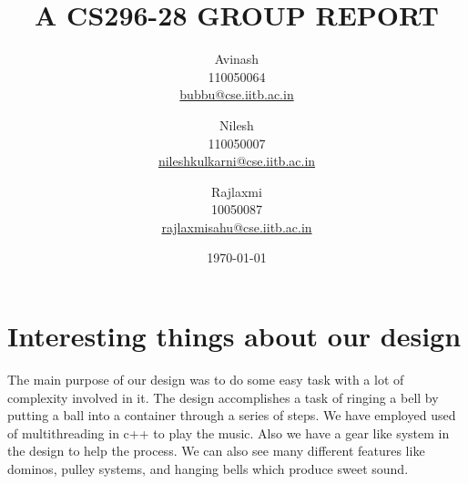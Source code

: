 \documentclass[a4paper,11pt]{article}
\begin{document}
\title{ A CS296-28 GROUP REPORT }
\author{
	Avinash\\
	110050064\\
	\href{mailto:bubbu@cse.iitb.ac.in}{bubbu@cse.iitb.ac.in}\\
	\and 
	Nilesh\\
	110050007\\
	\href{mailto:nileshkulkarni@cse.iitb.ac.in}{nileshkulkarni@cse.iitb.ac.in}\\
	\and
	Rajlaxmi\\
	10050087\\
	\href{mailto:rajlaxmisahu@cse.iitb.ac.in}{rajlaxmisahu@cse.iitb.ac.in}\\
	}
\date{\today}
\maketitle
{}
\tableofcontents	
\newpage
{}

\section{Interesting things about our design}
The main purpose of our design was to do some easy task with a lot of complexity involved in it. The design accomplishes a task of ringing a bell by putting a ball into a container through a series of steps. We have employed used of multithreading in c++ to play the music. Also we have a gear like system in the design to help the process. We can also see many different features like dominos, pulley systems, and hanging bells which produce sweet sound.
\end{document}
